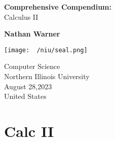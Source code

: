 \documentclass{report}
\title{\Huge{}}
\author{\huge{Nathan Warner}}
\date{\huge{}}
\begin{document}
        \begin{titlepage}
       \begin{center}
           \vspace*{1cm}
    
           \textbf{Comprehensive Compendium:} \\
            Calculus II
    
           \vspace{0.5cm}
            
                
           \vspace{1.5cm}
    
           \textbf{Nathan Warner}
    
           \vfill
                
                
           \vspace{0.8cm}
         
           \texttt{[image: ~/niu/seal.png]}
                
           Computer Science \\
           Northern Illinois University\\
           August 28,2023 \\
           United States\\
           
                
       \end{center}
    \end{titlepage}
    \tableofcontents
    \pagebreak \bigbreak \noindent
    \section{\LARGE Calc II}
    \bigbreak \noindent 

    \bigbreak \noindent 
\end{document}
